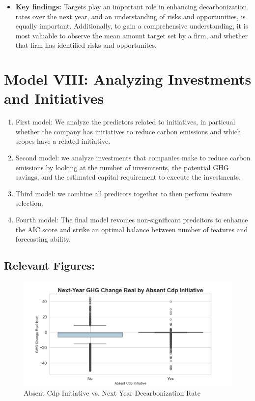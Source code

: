 \begin{itemize}
\item \textbf{Key findings:} Targets play an important role in enhancing decarbonization rates over the next year, and an understanding of risks and opportunities, is equally important. Additionally, to gain a comprehensive understanding, it is most valuable to observe the mean amount target set by a firm, and whether that firm has identified risks and opportunites.

\end{itemize}

\section{Model VIII: Analyzing Investments and Initiatives}

\begin{enumerate}
    \item First model: We analyze the predictors related to initiatives, in particual whether the company has initiatives to reduce carbon emissions and which scopes have a related initiative. 
    \item Second model: we analyze investments that companies make to reduce carbon emissions by looking at the number of invesmtents, the potential GHG savings, and the estimated capital requirement to execute the investments.
    \item Third model: we combine all predicors together to then perform feature selection.
    \item Fourth model: The final model revomes non-significant predcitors to enhance the AIC score and strike an optimal balance between number of features and forecasting ability.
\end{enumerate}




\subsection{Relevant Figures:}

\begin{figure}[H]
\centering
  \includegraphics[width=\textwidth]{figures/ghg_change_real_next_by_absent_cdp_initiative.png}
\caption{Absent Cdp Initiative vs. Next Year Decarbonization Rate}
\label{fig:ghg_change_real_next_by_absent_cdp_initiative}
\end{figure}

